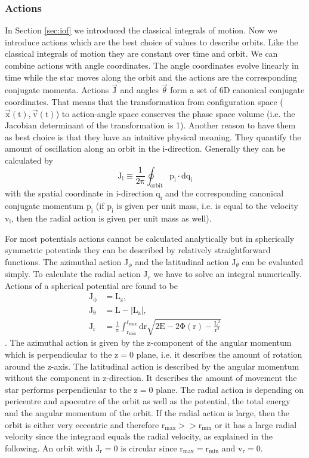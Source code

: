 \subsubsection{Actions}\label{sec:actions}
In Section \ref{sec:iof} we introduced the classical integrals of motion. Now we introduce actions which are the best choice of values to describe orbits. Like the classical integrals of motion they are constant over time and orbit. We can combine actions with angle coordinates. The angle coordinates evolve linearly in time while the star moves along the orbit and the actions are the corresponding conjugate momenta. Actions $\vec{\mathrm{J}}$ and angles $\vec{\theta}$ form a set of 6D canonical conjugate coordinates. That means that the transformation from configuration space (\(\vec{\mathrm{x}}(\mathrm{t}),\vec{\mathrm{v}}(\mathrm{t})\)) to action-angle space conserves the phase space volume (i.e. the Jacobian determinant of the transformation is 1). Another reason to have them as best choice is that they have an intuitive physical meaning. They quantify the amount of oscillation along an orbit in the i-direction. Generally they can be calculated by 
\begin{equation}\label{eq:gen_actions}
\mathrm{J_i\equiv\frac{1}{2\pi}\oint_{orbit} p_i\cdot dq_i}
\end{equation} with the spatial coordinate in i-direction \(\mathrm{q_i}\) and the corresponding canonical conjugate momentum \(\mathrm{p_i}\) (if \(\mathrm{p_i}\) is given per unit mass, i.e. is equal to the velocity \(\mathrm{v_i}\), then the radial action is given per unit mass as well). 
\par For most potentials actions cannot be calculated analytically but in spherically symmetric potentials they can be described by relatively straightforward functions. The azimuthal action J\(_\phi\) and the latitudinal action J\(_\theta\) can be evaluated simply. To calculate the radial action J\(_r\) we have to solve an integral numerically. Actions of a spherical potential are found to be 
\begin{align}
\mathrm{J_\phi}&=\mathrm{ L_z}, \label{eq:j_phi} \\\mathrm{ J_\theta}&=\mathrm{ L-|L_z|},  \label{eq:j_theta}\\ \mathrm{J_r}&=\mathrm{ \frac{1}{\pi} \int_{r_{min}}^{r_{max}} \mathrm{d}r \sqrt{2E-2\Phi(r)-\frac{L^2}{r^2}}} \label{eq:radial_action}
\end{align} \citep[p. 221]{2008gady.book.....B}.
The azimuthal action is given by the z-component of the angular momentum which is perpendicular to the z$=0$ plane, i.e. it describes the amount of rotation around the z-axis. The latitudinal action is described by the angular momentum without the component in z-direction. It describes the amount of movement the star performs perpendicular to the z$=0$ plane. The radial action is depending on pericentre and apocentre of the orbit as well as the potential, the total energy and the angular momentum of the orbit. If the radial action is large, then the orbit is either very eccentric and therefore \(\mathrm{r_{max}>>r_{min}}\) or it has a large radial velocity since the integrand equals the radial velocity, as explained in the following. An orbit with $\mathrm{J_r}=0$ is circular since \(\mathrm{r_{max}=r_{min}}\) and $\mathrm{v_r}=0$.

